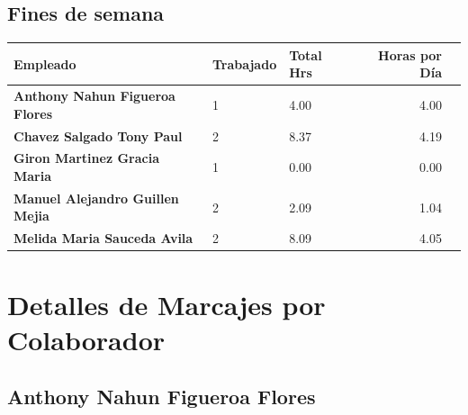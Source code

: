 \documentclass[11pt,a4paper]{article}
\newcommand{\mejoradatabla}[1]{
  \renewcommand{\arraystretch}{1.3}
  \setlength{\tabcolsep}{10pt}
#1
  \renewcommand{\arraystretch}{1}
  \setlength{\tabcolsep}{6pt}
}
\begin{document}
\subsection{Fines de semana}

\vspace{0.5cm}
\begin{table}[H]
\centering
\mejoradatabla{
\begin{tabular}{>{\bfseries}lllrr}
\toprule
\rowcolor{grisclaro} \textbf{Empleado} & \textbf{Trabajado} & \textbf{Total Hrs} & \textbf{Horas por Día}\\
\midrule














Anthony Nahun Figueroa Flores & 1 & 4.00 & 4.00\\



Chavez Salgado Tony Paul & 2 & 8.37 & 4.19\\



Giron Martinez Gracia Maria & 1 & 0.00 & 0.00\\



Manuel Alejandro Guillen Mejia & 2 & 2.09 & 1.04\\



Melida Maria Sauceda Avila & 2 & 8.09 & 4.05\\


\bottomrule
\end{tabular}
}
\end{table}





\clearpage

\section{Detalles de Marcajes por Colaborador}

\subsection{ Anthony Nahun Figueroa Flores }
\end{document}
